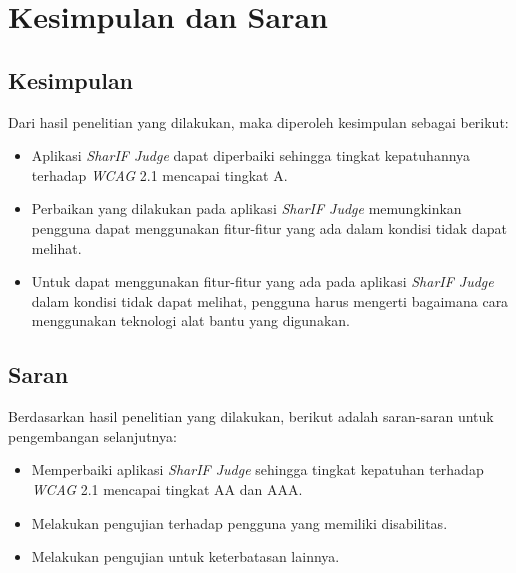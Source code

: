 \chapter{Kesimpulan dan Saran}
\label{chap:kesimpulan_dan_saran}

\section{Kesimpulan}
\label{sec:kesimpulan}
Dari hasil penelitian yang dilakukan, maka diperoleh kesimpulan sebagai berikut:
\begin{itemize}
	\item Aplikasi \textit{SharIF Judge} dapat diperbaiki sehingga tingkat kepatuhannya terhadap \textit{WCAG} 2.1 mencapai tingkat A.
	\item Perbaikan yang dilakukan pada aplikasi \textit{SharIF Judge} memungkinkan pengguna dapat menggunakan fitur-fitur yang ada dalam kondisi tidak dapat melihat.
	\item Untuk dapat menggunakan fitur-fitur yang ada pada aplikasi \textit{SharIF Judge} dalam kondisi tidak dapat melihat, pengguna harus mengerti bagaimana cara menggunakan teknologi alat bantu yang digunakan.
\end{itemize}

\section{Saran}
\label{sec:saran}
Berdasarkan hasil penelitian yang dilakukan, berikut adalah saran-saran untuk pengembangan selanjutnya:
\begin{itemize}
	\item Memperbaiki aplikasi \textit{SharIF Judge} sehingga tingkat kepatuhan terhadap \textit{WCAG} 2.1 mencapai tingkat AA dan AAA.
	\item Melakukan pengujian terhadap pengguna yang memiliki disabilitas.
	\item Melakukan pengujian untuk keterbatasan lainnya.
\end{itemize}